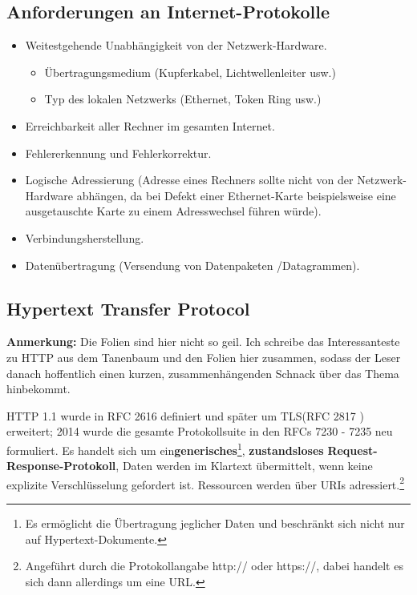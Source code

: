 \documentclass{article} %
\begin{document}
\subsection{Anforderungen an Internet-Protokolle}

\begin{itemize}
	\item Weitestgehende Unabhängigkeit von der Netzwerk-Hardware.
	\begin{itemize}
		\item Übertragungsmedium (Kupferkabel, Lichtwellenleiter usw.)
		\item Typ des lokalen Netzwerks (Ethernet, Token Ring usw.)
	\end{itemize}
	\item Erreichbarkeit aller Rechner im gesamten Internet.
	\item Fehlererkennung und Fehlerkorrektur.
	\item Logische Adressierung (Adresse eines Rechners sollte nicht von der Netzwerk-Hardware abhängen, da bei Defekt einer Ethernet-Karte beispielsweise eine ausgetauschte Karte zu einem Adresswechsel führen würde).
	\item Verbindungsherstellung.
	\item Datenübertragung (Versendung von Datenpaketen /Datagrammen).
\end{itemize}

\subsection{Hypertext Transfer Protocol}
\begin{framed}
\textbf{Anmerkung: } Die Folien sind hier nicht so geil.
Ich schreibe das Interessanteste zu HTTP aus dem Tanenbaum\cite{tanenbaum2003computer} und den Folien hier zusammen, sodass der Leser danach hoffentlich einen kurzen, zusammenhängenden Schnack über das Thema hinbekommt.
\end{framed}

HTTP 1.1 wurde in RFC 2616\cite{rfc2616} definiert und später um  TLS(RFC 2817 \cite{rfc2817}) erweitert; 2014 wurde die gesamte Protokollsuite in den RFCs 7230 - 7235 neu formuliert\cite{rfc7230,rfc7231,rfc7232,rfc7233,rfc7234,rfc7235}.
Es handelt sich um ein\textbf{generisches}\footnote{Es ermöglicht die Übertragung jeglicher Daten und beschränkt sich nicht nur auf Hypertext-Dokumente.}, \textbf{zustandsloses} \textbf{Request-Response-Protokoll}, 
Daten werden im Klartext übermittelt, wenn keine explizite Verschlüsselung gefordert ist.
Ressourcen werden über URIs\cite{rfc2396} adressiert.\footnote{Angeführt durch die Protokollangabe http:// oder https://, dabei handelt es sich dann allerdings um eine URL.}
\end{document}
